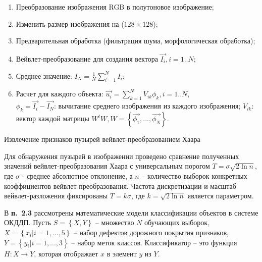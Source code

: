\begin{algorithm}[ht!]
  \begin{enumerate}[label=\textbf{Шаг~\arabic*.},leftmargin=4em,ref=\arabic*]
  \item Преобразование изображения RGB в полутоновое изображение;
  \item Изменить размер изображения на ($128 \times 128$);
  \item Предварительная обработка (фильтрация шума, морфологическая обработка);
  \item Вейвлет-преобразование для создания вектора $\vec{I_i}, i=1..N$;
  \item Среднее значение: $I_N=\frac{1}{N}\sum_{i=1}^N I_i$;
  \item Расчет для каждого объекта: $\vec{u_i}=\sum_{k=1}^N V_{ik} \phi_k, i=1..N,$\\
		$\phi_k=\vec{I_i}-\vec{I_N}$: вычитание среднего изображения из каждого изображения;
			$V_{ik}$: вектор каждой матрицы $W^tW, W=\left\{\vec{\phi_1},...,\vec{\phi_N}\right\}.$
  \end{enumerate}
  \caption{Извлечение признаков пузырей вейвлет-преобразованием Хаара}\label{alg5}
\end{algorithm}

Для обнаружения пузырей в изображении проведено сравнение полученных значений вейвлет-преобразования Хаара с универсальным порогом $ T = \sigma \sqrt {2 \ln n} $, где $ \sigma $ - среднее абсолютное отклонение, а $ n $ -- количество выборок конкретных коэффициентов вейвлет-преобразования. Частота дискретизации и масштаб вейвлет-разложения фиксированы $ T = k \sigma $, где $ k = \sqrt {2 \ln n} $ является параметром.

В \textbf{п.~2.3} рассмотрены математические модели классификации объектов в системе ОКДДП. Пусть  $S=\left\{X, Y\right\}$ -- множество $N$ обучающих выборок, $X=\left\{x_i | i = 1, ..., 5\right\}$ --  набор дефектов дорожного покрытия признаков, $Y = \left\{y_i |i = 1, ..., 3\right\}$ -- набор меток классов. Классификатор -- это функция $H: X \rightarrow Y$, которая отображает $x$ в элемент $y$ из $Y$.

